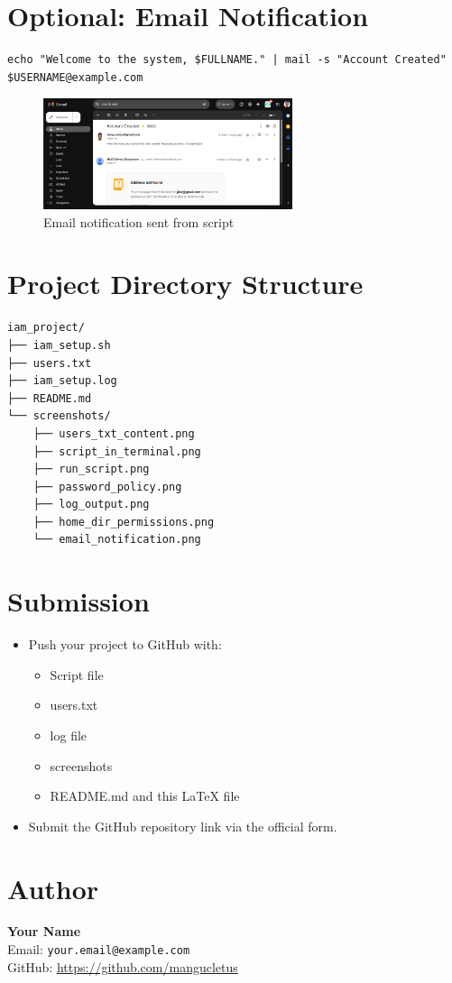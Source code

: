 \documentclass[a4paper,11pt]{article}
\begin{document}
\section*{Optional: Email Notification}

\begin{lstlisting}
echo "Welcome to the system, $FULLNAME." | mail -s "Account Created" $USERNAME@example.com
\end{lstlisting}

\begin{figure}[h!]
  \centering
  \includegraphics[width=0.65\textwidth]{screenshots/email_notification.png}
  \caption{Email notification sent from script}
\end{figure}

\section*{Project Directory Structure}
\begin{lstlisting}
iam_project/
├── iam_setup.sh
├── users.txt
├── iam_setup.log
├── README.md
└── screenshots/
    ├── users_txt_content.png
    ├── script_in_terminal.png
    ├── run_script.png
    ├── password_policy.png
    ├── log_output.png
    ├── home_dir_permissions.png
    └── email_notification.png
\end{lstlisting}

\section*{Submission}
\begin{itemize}
  \item Push your project to GitHub with:
    \begin{itemize}
      \item Script file
      \item users.txt
      \item log file
      \item screenshots
      \item README.md and this LaTeX file
    \end{itemize}
  \item Submit the GitHub repository link via the official form.
\end{itemize}

\section*{Author}
\textbf{Your Name} \\
Email: \texttt{your.email@example.com} \\
GitHub: \url{https://github.com/mangucletus}
\end{document}
